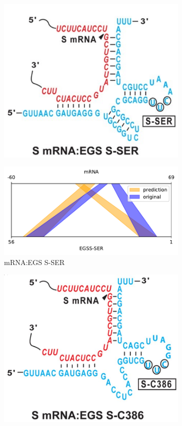 \documentclass[twoside,a4paper]{report}
\numberwithin{equation}{section}
\begin{document}
	 
	 \begin{figure}[h!tb]
	 	\centering
	 	\begin{subfigure}{.25\textwidth}
	 		\centering
	 		\includegraphics[width=.9\linewidth]{mrnaegs}	
	 		\label{fig:mrnaegs}
	 	\end{subfigure}%
		\begin{subfigure}{.5\textwidth}
			\centering
			\includegraphics[width=.9\linewidth]{rricomparison7}
			\caption{mRNA:EGS S-SER}
			\label{fig:rricomparison7}
		\end{subfigure}
	 	\begin{subfigure}{.25\textwidth}
	 		\centering
	 		\includegraphics[width=.9\linewidth]{SC386}

\end{subfigure}
\end{figure}
\end{document}
